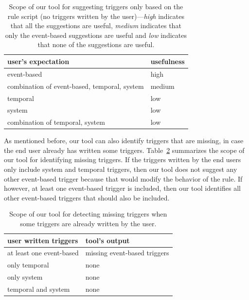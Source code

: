 \documentclass{sig-alternate-05-2015}
\begin{document}
\begin{table}[ht]
\centering
\begin{tabular}{|l|l|}
\hline
user's expectation & usefulness \\ \hline
event-based & high \\ \hline
combination of event-based, temporal, system  & medium \\ \hline
temporal & low \\\hline
system & low \\ \hline
combination of temporal, system & low  \\ \hline
\end{tabular}
\caption{Scope of our tool for suggesting triggers only based on the rule script (no triggers written by the user)---\textit{high} indicates that all the suggestions are useful, \textit{medium} indicates that only the event-based suggestions are useful and \textit{low} indicates that none of the suggestions are useful. }
\label{tab:scope1}
\end{table}

As mentioned before, our tool can also identify triggers that are missing, in case the end user already has written some triggers. Table~\ref{tab:scope2} summarizes the scope of our tool for identifying missing triggers. If the triggers written by the end users only include system and temporal triggers, then our tool does not suggest any other event-based trigger because that would modify the behavior of the rule. If however, at least one event-based trigger is included, then our tool identifies all other event-based triggers that should also be included. 
\begin{table}[ht]
\centering
\begin{tabular}{|l|l|}
\hline
user written triggers & tool's output \\ \hline
at least one event-based & missing event-based triggers \\ \hline
only temporal & none \\\hline
only system & none \\ \hline
temporal and system & none  \\ \hline
\end{tabular}
\caption{Scope of our tool for detecting missing triggers when some triggers are already written by the user.}
\label{tab:scope2}
\end{table}
\end{document}
